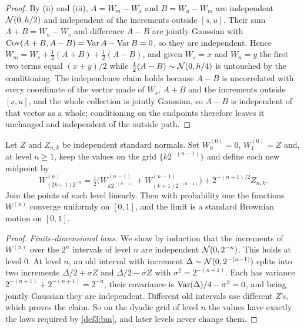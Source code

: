 \begin{chapterrefs}
\begin{proof}
By (ii) and (iii), $A=W_m-W_s$ and $B=W_u-W_m$ are independent $\mathcal{N}(0,h/2)$ and independent of the
increments outside $[s,u]$. Their sum $A+B=W_u-W_s$ and difference $A-B$ are jointly Gaussian with
$\operatorname{Cov}(A+B,A-B)=\operatorname{Var} A-\operatorname{Var} B=0$, so they are independent. Hence
$W_m = W_s + \tfrac12(A+B) + \tfrac12(A-B)$, and given $W_s=x$ and $W_u=y$ the first two terms equal
$(x+y)/2$ while $\tfrac12(A-B)\sim\mathcal{N}(0,h/4)$ is untouched by the conditioning. The independence claim
holds because $A-B$ is uncorrelated with every coordinate of the vector made of $W_s$, $A+B$ and the
increments outside $[s,u]$, and the whole collection is jointly Gaussian, so $A-B$ is independent of
that vector as a whole; conditioning on the endpoints therefore leaves it unchanged and independent
of the outside path.
\end{proof}

\begin{theorem}[L\'evy]\label{thm3:levy}
Let $Z$ and $Z_{n,k}$ be independent standard normals. Set $W^{(0)}_0=0$, $W^{(0)}_1=Z$ and, at level
$n\ge1$, keep the values on the grid $\{k2^{-(n-1)}\}$ and define each new midpoint by
\begin{equation}\label{eq3:levy}
  W^{(n)}_{(2k+1)2^{-n}} = \tfrac12\bigl(W^{(n-1)}_{k2^{-(n-1)}} + W^{(n-1)}_{(k+1)2^{-(n-1)}}\bigr)
  + 2^{-(n+1)/2} Z_{n,k} .
\end{equation}
Join the points of each level linearly. Then with probability one the functions $W^{(n)}$ converge
uniformly on $[0,1]$, and the limit is a standard Brownian motion on $[0,1]$.
\end{theorem}

\begin{proof}
\emph{Finite-dimensional laws.} We show by induction that the increments of $W^{(n)}$ over the $2^n$
intervals of level $n$ are independent $\mathcal{N}(0,2^{-n})$. This holds at level $0$. At level $n$, an old
interval with increment $\Delta\sim\mathcal{N}(0,2^{-(n-1)})$ splits into two increments
$\Delta/2+\sigma Z$ and $\Delta/2-\sigma Z$ with $\sigma^2=2^{-(n+1)}$. Each has variance
$2^{-(n+1)}+2^{-(n+1)}=2^{-n}$, their covariance is $\operatorname{Var}(\Delta)/4-\sigma^2=0$, and being jointly Gaussian
they are independent. Different old intervals use different $Z$'s, which proves the claim. So on the
dyadic grid of level $n$ the values have exactly the laws required by \cref{def3:bm}, and later levels
never change them.


\end{proof}
\end{chapterrefs}

